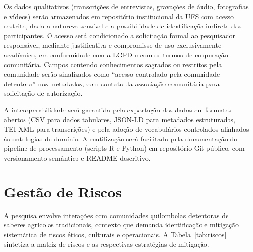 Os dados qualitativos (transcrições de entrevistas, gravações de áudio, fotografias e vídeos) serão armazenados em repositório institucional da UFS com acesso restrito, dada a natureza sensível e a possibilidade de identificação indireta dos participantes. O acesso será condicionado a solicitação formal ao pesquisador responsável, mediante justificativa e compromisso de uso exclusivamente acadêmico, em conformidade com a LGPD e com os termos de cooperação comunitária. Campos contendo conhecimentos sagrados ou restritos pela comunidade serão sinalizados como ``acesso controlado pela comunidade detentora'' nos metadados, com contato da associação comunitária para solicitação de autorização.

A interoperabilidade será garantida pela exportação dos dados em formatos abertos (CSV para dados tabulares, JSON-LD para metadados estruturados, TEI-XML para transcrições) e pela adoção de vocabulários controlados alinhados às ontologias do domínio. A reutilização será facilitada pela documentação do pipeline de processamento (scripts R e Python) em repositório Git público, com versionamento semântico e README descritivo.


\section{Gestão de Riscos}
\label{sec:riscos_geral}

A pesquisa envolve interações com comunidades quilombolas detentoras de saberes agrícolas tradicionais, contexto que demanda identificação e mitigação sistemática de riscos éticos, culturais e operacionais. A Tabela~\ref{tab:riscos} sintetiza a matriz de riscos e as respectivas estratégias de mitigação.

